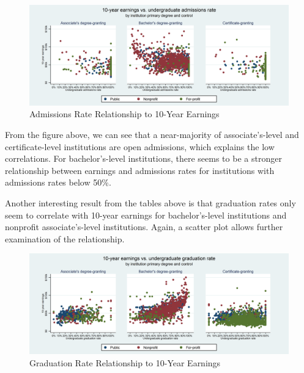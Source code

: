 \documentclass[12pt]{article}
\numberwithin{equation}{section}
\begin{document}
\begin{figure}[h!]
\caption{Admissions Rate Relationship to 10-Year Earnings}
\label{fig:aid_p10_relationship}
\begin{adjustbox}{center}
\includegraphics[width=7.0in]{../p10_admrate_correlations_by_preddeg_mr.png}
\end{adjustbox}
\centering
\end{figure}

From the figure above, we can see that a near-majority of associate's-level and certificate-level institutions are open admissions, which explains the low correlations. For bachelor's-level institutions, there seems to be a stronger relationship between earnings and admissions rates for institutions with admissions rates below 50\%.

Another interesting result from the tables above is that graduation rates only seem to correlate with 10-year earnings for bachelor's-level institutions and nonprofit associate's-level institutions. Again, a scatter plot allows further examination of the relationship.

\begin{figure}[h!]
\caption{Graduation Rate Relationship to 10-Year Earnings}
\label{fig:grad_rate_p10_relationship}
\begin{adjustbox}{center}
\includegraphics[width=7.0in]{../p10_gradrate_correlations_by_preddeg_mr.png}
\end{adjustbox}
\centering
\end{figure}
\end{document}

